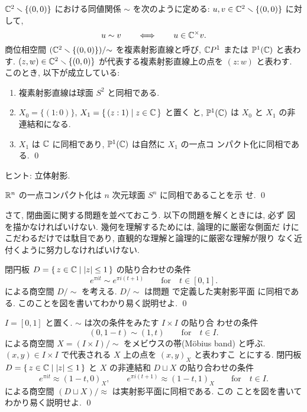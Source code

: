 \documentclass[12pt,twoside]{jarticle}
\def\R{{\Bbb R}} %
\def\C{{\Bbb C}} %
\def\P{{\Bbb P}}
\begin{document}
\begin{question}[複素射影直線]\label{q:cpx-proj-line}
  $\C^2 \setminus \{(0,0)\}$ における同値関係 $\sim$ を次のように定める: %
  $u, v \in \C^2 \setminus\{(0,0)\}$ に対して,
  \[
    u \sim v
    \qquad\Longleftrightarrow\qquad
    u \in \C^{\times} v.
  \]
  商位相空間 $(\C^2 \setminus \{(0,0)\})/{\sim}$ を複素射影直線と呼び, %
  $\C P^1$ または $\P^1(\C)$ と表わす. %
  $(z,w)\in\C^2\setminus\{(0,0)\}$ が代表する複素射影直線上の点を %
  $(z:w)$ と表わす. このとき, 以下が成立している: %
  \begin{enumerate}
  \item 複素射影直線は球面 $S^2$ と同相である. 
  \item $X_0 = \{(1:0)\}$, $X_1 = \{\,(z:1) \mid z \in \C \,\}$ と置く
    と, $\P^1(\C)$ は $X_0$ と $X_1$ の非連結和になる.
  \item $X_1$ は $\C$ に同相であり, $\P^1(\C)$ は自然に $X_1$ の一点コ
    ンパクト化に同相である.  \qed
  \end{enumerate}
\end{question}

\noindent ヒント: 立体射影.

\begin{question}
  $\R^n$ の一点コンパクト化は $n$ 次元球面 $S^n$ に同相であることを示
  せ. \qed
\end{question}

さて, 閉曲面に関する問題を並べておこう. 以下の問題を解くときには, 必ず
図を描かなければいけない. 幾何を理解するためには, 論理的に厳密な側面だ
けにこだわるだけでは駄目であり, 直観的な理解と論理的に厳密な理解が限り
なく近付くように努力しなければいけない.

\begin{question}
  閉円板 $D = \{\, z \in \C \mid |z| \le 1 \,\}$ の貼り合わせの条件
  \[
    e^{\pi i t} \sim e^{\pi i (t + 1)}
    \qquad\text{for}\quad
    t \in [0,1].
  \] %
  による商空間 $D/{\sim}$ を考える. %
  $D/{\sim}$ は問題  で定義した実射影平面
  に同相である. このことを図を書いてわかり易く説明せよ. \qed
\end{question}

\begin{question}
  $I = [0,1]$ と置く. $\sim$ は次の条件をみたす $I \times I$ の貼り合
  わせの条件
  \[
    (0,1-t) \sim (1,t)
    \qquad\text{for}\quad
    t \in I.
  \]
  による商空間 $X = (I \times I)/{\sim}$ をメビウスの帯(M\"obius band)
  と呼ぶ. %
  $(x,y)\in I \times I$ で代表される $X$ 上の点を $(x,y)_X$ と表わすこ
  とにする. 閉円板 $D = \{\, z \in \C \mid |z| \le 1 \,\}$ %
  と $X$ の非連結和 $D \sqcup X$ の貼り合わせの条件
  \[
    e^{\pi i t}     \approx (1-t,0)_X,
    \qquad
    e^{\pi i (t+1)} \approx (1-t,1)_X
    \qquad\text{for}\quad
    t \in I.
  \] %
  による商空間 $(D \sqcup X)/{\approx}$ は実射影平面に同相である. この
  ことを図を書いてわかり易く説明せよ.  \qed
\end{question}
\end{document}
